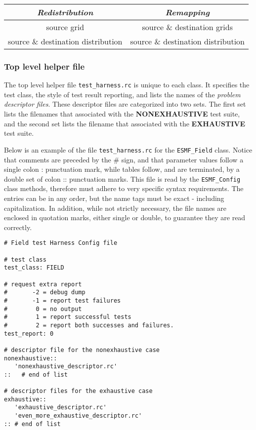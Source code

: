 \begin{center}
\begin{tabular}{| c | c |} \hline \hline
{\em Redistribution} & {\em Remapping} \\
\hline
source grid & source \& destination grids  \\
source \& destination distribution &  source \& destination distribution \\
\hline
\end{tabular}
\end{center}

 
\subsubsection{Top level helper file}
The top level helper file \texttt{test\_harness.rc} is unique to each class. It specifies the test class, the style of test result reporting, and lists the names of the \textit{problem descriptor files}. These descriptor files are categorized into two sets. The first set lists the filenames that associated with the \textbf{NONEXHAUSTIVE} test suite, and the second set lists the filename that associated with the \textbf{EXHAUSTIVE} test suite. 

Below is an example of the file \texttt{test\_harness.rc} for the \texttt{ESMF\_Field} class. Notice that comments are preceded by the {\#} sign, and that parameter values follow a single colon {:} punctuation mark, while tables follow, and are terminated, by a double set of colon {::} punctuation marks.  This file is read by the \texttt{ESMF\_Config} class methods, therefore must adhere to very specific syntax requirements. The entries can be in any order, but the name tags must be exact - including capitalization. In addition, while not strictly necessary, the file names are enclosed in quotation marks, either single or double, to guarantee they are read correctly.
\begin{verbatim}
# Field test Harness Config file

# test class
test_class: FIELD 

# request extra report
#       -2 = debug dump
#       -1 = report test failures 
#        0 = no output
#        1 = report successful tests
#        2 = report both successes and failures.
test_report: 0 

# descriptor file for the nonexhaustive case
nonexhaustive::
   'nonexhaustive_descriptor.rc'
::   # end of list

# descriptor files for the exhaustive case
exhaustive::
   'exhaustive_descriptor.rc'
   'even_more_exhaustive_descriptor.rc'
:: # end of list
\end{verbatim}

